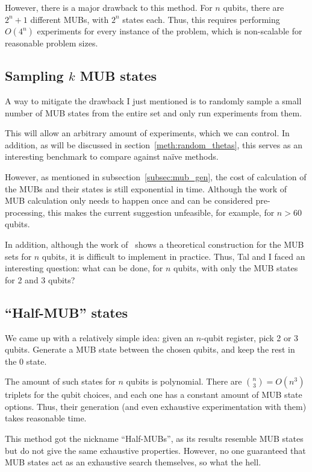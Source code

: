 \documentclass[a4paper,12pt]{article}
\begin{document}
However, there is a major drawback to this method.
For $n$ qubits, there are $2^n+1$ different MUBs, with $2^n$ states each.
Thus, this requires performing $O(4^n)$ experiments for every instance of the problem, which is non-scalable for reasonable problem sizes.

\subsection{Sampling $k$ MUB states} \label{meth:k_mub}
A way to mitigate the drawback I just mentioned is to randomly sample a small number of MUB states from the entire set and only run experiments from them.

This will allow an arbitrary amount of experiments, which we can control.
In addition, as will be discussed in section~\ref{meth:random_thetas}, this serves as an interesting benchmark to compare against na{\"i}ve methods.

However, as mentioned in subsection~\ref{subsec:mub_gen}, the cost of calculation of the MUBs and their states is still exponential in time. Although the work of MUB calculation only needs to happen once and can be considered pre-processing, this makes the current suggestion unfeasible, for example, for $n>60$ qubits.

In addition, although the work of~\cite{bandyopadhyay_new_2002} shows a theoretical construction for the MUB sets for $n$ qubits, it is difficult to implement in practice.
Thus, Tal and I faced an interesting question: what can be done, for $n$ qubits, with only the MUB states for 2 and 3 qubits?

\subsection{``Half-MUB'' states} \label{meth:half_mub}
We came up with a relatively simple idea: given an $n$-qubit register, pick 2 or 3 qubits. Generate a MUB state between the chosen qubits, and keep the rest in the 0 state.

The amount of such states for $n$ qubits is polynomial. There are ${n \choose 3} = O(n^3)$ triplets for the qubit choices, and each one has a constant amount of MUB state options.
Thus, their generation (and even exhaustive experimentation with them) takes reasonable time.

This method got the nickname ``Half-MUBs'', as its results resemble MUB states but do not give the same exhaustive properties.
However, no one guaranteed that MUB states act as an exhaustive search themselves, so what the hell.
\end{document}
